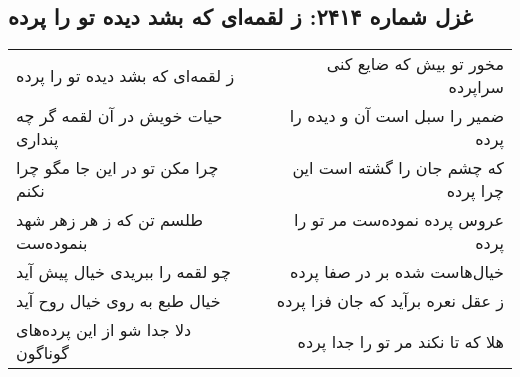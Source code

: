 \begin{center}
\section*{غزل شماره ۲۴۱۴: ز لقمه‌ای که بشد دیده تو را پرده}
\label{sec:2414}
\begin{longtable}{l p{0.5cm} r}
ز لقمه‌ای که بشد دیده تو را پرده
&&
مخور تو بیش که ضایع کنی سراپرده
\\
حیات خویش در آن لقمه گر چه پنداری
&&
ضمیر را سبل است آن و دیده را پرده
\\
چرا مکن تو در این جا مگو چرا نکنم
&&
که چشم جان را گشته است این چرا پرده
\\
طلسم تن که ز هر زهر شهد بنموده‌ست
&&
عروس پرده نموده‌ست مر تو را پرده
\\
چو لقمه را ببریدی خیال پیش آید
&&
خیال‌هاست شده بر در صفا پرده
\\
خیال طبع به روی خیال روح آید
&&
ز عقل نعره برآید که جان فزا پرده
\\
دلا جدا شو از این پرده‌های گوناگون
&&
هلا که تا نکند مر تو را جدا پرده
\\
\end{longtable}
\end{center}
